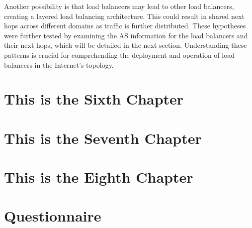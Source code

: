 \documentclass[12pt]{cwru_thesis}
\begin{document}
Another possibility is that load balancers may lead to other load balancers, creating a layered load balancing architecture. This could result in shared next hops across different domains as traffic is further distributed. These hypotheses were further tested by examining the AS information for the load balancers and their next hops, which will be detailed in the next section. Understanding these patterns is crucial for comprehending the deployment and operation of load balancers in the Internet's topology.



\chapter{This is the Sixth Chapter}
\chapter{This is the Seventh Chapter}
\chapter{This is the Eighth Chapter}


\appendix

\chapter{Questionnaire}

\printbibliography[heading=bibintoc]
\end{document}
